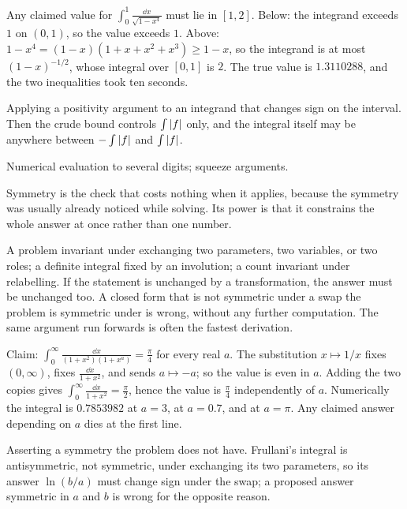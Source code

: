 \begin{worked}
Any claimed value for $\displaystyle\int_{0}^{1}\frac{\dd x}{\sqrt{1-x^{4}}}$ must lie in $[1,2]$. Below: the integrand exceeds $1$ on $(0,1)$, so the value exceeds $1$. Above: $1-x^{4}=(1-x)(1+x+x^{2}+x^{3})\geq 1-x$, so the integrand is at most $(1-x)^{-1/2}$, whose integral over $[0,1]$ is $2$. The true value is $1.3110288$, and the two inequalities took ten seconds.
\end{worked}

\begin{trap}
Applying a positivity argument to an integrand that changes sign on the interval. Then the crude bound controls $\int\left\lvert f\right\rvert$ only, and the integral itself may be anywhere between $-\int\left\lvert f\right\rvert$ and $\int\left\lvert f\right\rvert$.
\end{trap}

\begin{seealsob}Numerical evaluation to several digits; squeeze arguments.\end{seealsob}

Symmetry is the check that costs nothing when it applies, because the symmetry was usually already noticed while solving. Its power is that it constrains the whole answer at once rather than one number.

\cue A problem invariant under exchanging two parameters, two variables, or two roles; a definite integral fixed by an involution; a count invariant under relabelling.
\method If the statement is unchanged by a transformation, the answer must be unchanged too. A closed form that is not symmetric under a swap the problem is symmetric under is wrong, without any further computation. The same argument run forwards is often the fastest derivation.

\begin{worked}
Claim: $\displaystyle\int_{0}^{\infty}\frac{\dd x}{(1+x^{2})(1+x^{a})}=\frac{\pi}{4}$ for every real $a$. The substitution $x\mapsto 1/x$ fixes $(0,\infty)$, fixes $\frac{\dd x}{1+x^{2}}$, and sends $a\mapsto -a$; so the value is even in $a$. Adding the two copies gives $\int_{0}^{\infty}\frac{\dd x}{1+x^{2}}=\frac{\pi}{2}$, hence the value is $\frac{\pi}{4}$ independently of $a$. Numerically the integral is $0.7853982$ at $a=3$, at $a=0.7$, and at $a=\pi$. Any claimed answer depending on $a$ dies at the first line.
\end{worked}

\begin{trap}
Asserting a symmetry the problem does not have. Frullani's integral is antisymmetric, not symmetric, under exchanging its two parameters, so its answer $\ln(b/a)$ must change sign under the swap; a proposed answer symmetric in $a$ and $b$ is wrong for the opposite reason.
\end{trap}

